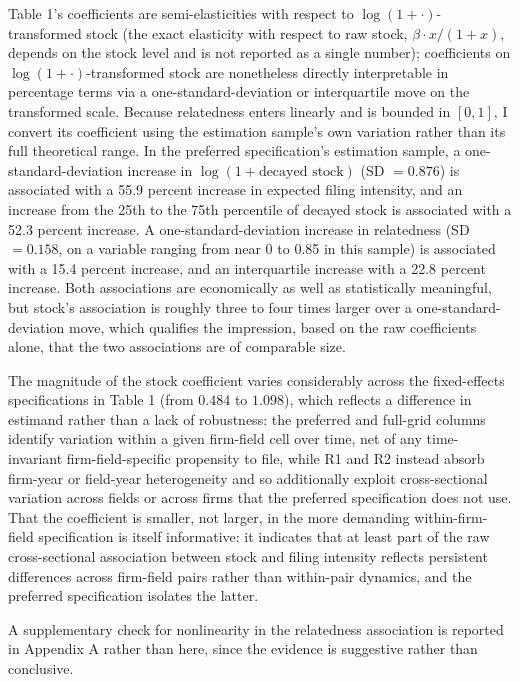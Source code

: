 \documentclass[12pt]{article}
\begin{document}
Table 1's coefficients are semi-elasticities with respect to $\log(1+\cdot)$-transformed stock (the exact elasticity with respect to raw stock, $\beta \cdot x/(1+x)$, depends on the stock level and is not reported as a single number); coefficients on $\log(1+\cdot)$-transformed stock are nonetheless directly interpretable in percentage terms via a one-standard-deviation or interquartile move on the transformed scale. Because relatedness enters linearly and is bounded in $[0,1]$, I convert its coefficient using the estimation sample's own variation rather than its full theoretical range. In the preferred specification's estimation sample, a one-standard-deviation increase in $\log(1+\text{decayed stock})$ (SD $=0.876$) is associated with a 55.9 percent increase in expected filing intensity, and an increase from the 25th to the 75th percentile of decayed stock is associated with a 52.3 percent increase. A one-standard-deviation increase in relatedness (SD $=0.158$, on a variable ranging from near 0 to 0.85 in this sample) is associated with a 15.4 percent increase, and an interquartile increase with a 22.8 percent increase. Both associations are economically as well as statistically meaningful, but stock's association is roughly three to four times larger over a one-standard-deviation move, which qualifies the impression, based on the raw coefficients alone, that the two associations are of comparable size.

The magnitude of the stock coefficient varies considerably across the fixed-effects specifications in Table 1 (from $0.484$ to $1.098$), which reflects a difference in estimand rather than a lack of robustness: the preferred and full-grid columns identify variation within a given firm-field cell over time, net of any time-invariant firm-field-specific propensity to file, while R1 and R2 instead absorb firm-year or field-year heterogeneity and so additionally exploit cross-sectional variation across fields or across firms that the preferred specification does not use. That the coefficient is smaller, not larger, in the more demanding within-firm-field specification is itself informative: it indicates that at least part of the raw cross-sectional association between stock and filing intensity reflects persistent differences across firm-field pairs rather than within-pair dynamics, and the preferred specification isolates the latter.

A supplementary check for nonlinearity in the relatedness association is reported in Appendix A rather than here, since the evidence is suggestive rather than conclusive.
\end{document}
